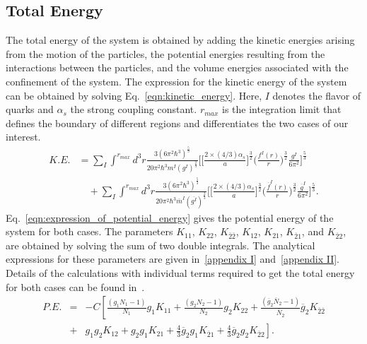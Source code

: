 \documentclass[preprint,12pt]{elsarticle}
\begin{document}
    \subsection{Total Energy}    
    \label{subsection:total_energy}
        The total energy of the system is obtained by adding the kinetic energies arising from the motion of the particles, the potential energies resulting from the interactions between the particles, and the volume energies associated with the confinement of the system. The expression for the kinetic energy of the system can be obtained by solving Eq.~\eqref{eqn:kinetic_energy}. Here, $I$ denotes the flavor of quarks and $\alpha_{s}$ the strong coupling constant. $r_{max}$ is the integration limit that defines the boundary of different regions and differentiates the two cases of our interest. 
         \begin{equation}
            \begin{split}
                K.E.  &= \sum_I \int^{r_{max}} d^3r \frac{3(6\pi^2\hbar^3)^\frac{5}{3}}{20\pi^2\hbar^3m^I(g^I)^\frac{2}{3}} \biggl[\biggl[\frac{2 \times (4/3)\alpha_s}{a}\biggr]^\frac{3}{2} \biggl(\frac{f^I(r)}{r}\biggr)^\frac{3}{2} \frac{g^I}{6\pi^2} \biggr]^\frac{5}{3} \\ & \quad + \sum_I \int^{r_{max}} d^3r \frac{3(6\pi^2\hbar^3)^\frac{5}{3}}{20\pi^2\hbar^3\overline{m}^I (\overline{g^I})^\frac{2}{3}} \biggl[\biggl[\frac{2 \times (4/3)\alpha_s}{a}\biggr]^\frac{3}{2} \biggl(\frac{\overline{f}^I(r)}{r}\biggr)^\frac{3}{2} \frac{\overline{g}^I}{6\pi^2}\biggr]^\frac{5}{3}.
                \label{eqn:kinetic_energy}
            \end{split}
        \end{equation}        
        Eq.~\eqref{eqn:expression_of_potential_energy} gives the potential energy of the system for both cases. The parameters $K_{11}$, $K_{22}$, $K_{\overline{2}\overline{2}}$, $K_{12}$, $K_{21}$, $K_{\overline{2}1}$, and $K_{\overline{2}2}$, are obtained by solving the sum of two double integrals. The analytical expressions for these parameters are given in~\ref{appendix I} and~\ref{appendix II}. Details of the calculations with individual terms required to get the total energy for both cases can be found in~\cite{aryal2024energy}.
        \begin{eqnarray}
            P.E. &=& -C\left[\frac{(g_1 N_1 - 1)}{N_1} g_1 K_{11}
            + \frac{(g_2 N_2 - 1)}{N_2} g_2 K_{22}
            + \frac{(\overline{g}_{2} \overline{N}_{2} - 1)}{\overline{N}_{2}} \overline{g}_{2} K_{\overline{2}\overline{2}} \right. \nonumber \\ 
            &+& g_{1} g_{2} K_{12} + g_{2} g_{1} K_{21}
            + \left. \tfrac{4}{3} \overline{g}_{2} g_1 K_{\overline{2}1} + \tfrac{4}{3} \overline{g}_{2} g_2 K_{\overline{2}2}\right].
            \label{eqn:expression_of_potential_energy}
        \end{eqnarray}
\end{document}
